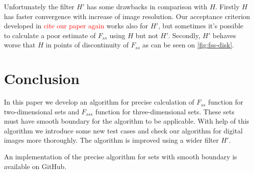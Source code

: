 \documentclass[reprint,amsmath,amssymb,aps,pre,showkeys,showpacs]{revtex4-1}
\begin{document}
Unfortunately the filter $H'$ has some drawbacks in comparison with $H$. Firstly
$H$ has faster convergence with increase of image resolution. Our
acceptance criterion developed in \textcolor{red}{cite our paper again} works
also for $H'$, but sometimes it's possible to calculate a poor estimate of
$F_{ss}$ using $H$ but not $H'$. Secondly, $H'$ behaves worse that $H$ in points
of discontinuity of $F_{ss}$ as can be seen on \cref{fig:fss-disk}.

\section{Conclusion}
\label{sec:summary}
In this paper we develop an algorithm for precise calculation of $F_{ss}$
function for two-dimensional sets and $F_{sss}$ function for three-dimensional
sets. These sets must have smooth boundary for the algorithm to be
applicable. With help of this algorithm we introduce some new test cases and
check our algorithm for digital images more thoroughly. The algorithm is
improved using a wider filter $H'$.

An implementation of the precise algorithm for sets with smooth boundary is
available on GitHub\cite{diff-boundary-corrfn}.


\end{document}
